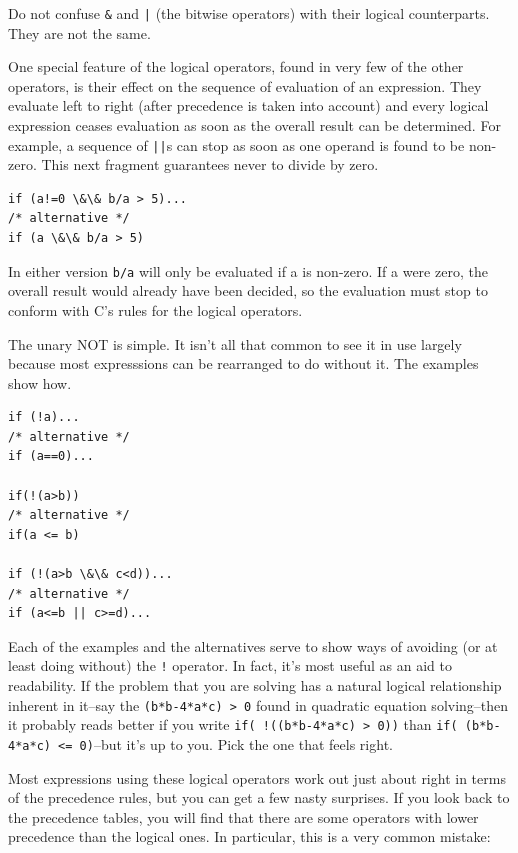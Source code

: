   Do not confuse \texttt{\&} and \texttt{|} (the bitwise
   operators) with their logical counterparts. They are not the same.


  One special feature of the logical operators, found in very few of the
   other operators, is their effect on the sequence of evaluation of an
   expression. They evaluate left to right (after precedence is taken into
   account) and every logical expression ceases evaluation as soon as the
   overall result can be determined. For example, a sequence of
   \texttt{||}s can stop as soon as one operand is found to be non-zero.
   This next fragment guarantees never to divide by zero.


  \begin{Verbatim}
if (a!=0 \&\& b/a > 5)...
/* alternative */
if (a \&\& b/a > 5)
\end{Verbatim}

  In either version \texttt{b/a} will only be evaluated if a is
   non-zero. If a were zero, the overall result would already have been
   decided, so the evaluation must stop to conform with C's rules for the
   logical operators.


  The unary NOT is simple. It isn't all that common to see it in use
   largely because most expresssions can be rearranged to do without it. The
   examples show how.


  \begin{Verbatim}
if (!a)...
/* alternative */
if (a==0)...

if(!(a>b))
/* alternative */
if(a <= b)

if (!(a>b \&\& c<d))...
/* alternative */
if (a<=b || c>=d)...
\end{Verbatim}

  Each of the examples and the alternatives serve to show ways of avoiding
   (or at least doing without) the \texttt{!} operator. In fact, it's most
   useful as an aid to readability. If the problem that you are solving has a
   natural logical relationship inherent in it--say the \texttt{(b*b-4*a*c)
   > 0} found in quadratic equation solving--then it probably
   reads better if you write \texttt{if( !((b*b-4*a*c) > 0))} than
   \texttt{if( (b*b-4*a*c) <= 0)}--but it's up to you. Pick the one
   that feels right.


  Most expressions using these logical operators work out just about right
   in terms of the precedence rules, but you can get a few nasty surprises. If
   you look back to the precedence tables, you will find that there are some
   operators with lower precedence than the logical ones. In particular, this
   is a very common mistake:


